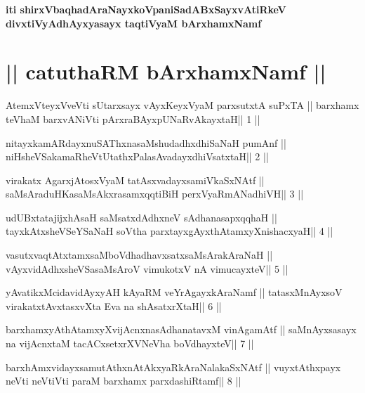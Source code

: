 \begin{center}
{\bf iti shirxVbaqhadAraNayxkoVpaniSadABxSayxvAtiRkeV\\ 
divxtiVyAdhAyxyasayx taqtiVyaM bArxhamxNamf}
\end{center}

\section{|| catuthaRM bArxhamxNamf  ||}

\begin{shl}
AtemxVteyxVveVti sUtarxsayx vAyxKeyxVyaM parxsutxtA suPxTA ||
barxhamx teV\s haM barxvANiVti pArxraBAyx\s\s pUNaRvAkayxtaH\hfill || 1 ||
\end{shl}

\begin{shl}
nitayxkamARdayxnuSAThxnasaMshudadhxdhiSaNaH pumAnf ||
niHsheVSakamaRheVtUtathxPalasAvadayxdhiVsatxtaH\hfill || 2 ||
\end{shl}

\begin{shl}
virakatx AgarxjAtosxV\s yaM tatAsxvadayxsamiVkaSxNAtf ||
saMsAraduHKasaMsAkxrasamxqqtiBiH perxVyaRmANadhiVH\hfill || 3 ||
\end{shl}

\begin{shl}
udUBxtatajijxhAsaH saMsatxdAdhxneV sAdhanasapxqqhaH ||
tayxkAtxsheVSeYSaNaH soV\s tha parxtayxgAyxthAtamxyXnishacxyaH\hfill || 4 ||
\end{shl}

\begin{shl}
vasutxvaqtAtxtamxsaMboVdhadhavxsatxsaMsArakAraNaH ||
vAyxvidAdhxsheVSasaMsAroV vimukotxV nA vimucayxteV\hfill || 5 ||
\end{shl}

\begin{shl}
yAvatikxMcidavidAyxyAH kAyaRM veYrAgayxkAraNamf ||
tatasxMnAyxsoV virakatxtAvxtasxvXta Eva na shAsatxrXtaH\hfill || 6 ||
\end{shl}

\begin{shl}
barxhamxyAthAtamxyXvijAcnxnasAdhanatavxM vinA\s\s gamAtf ||
saMnAyxsasayx na vijAcnxtaM tacACxsetxrXVNeVha boVdhayxteV\hfill || 7 ||
\end{shl}

\begin{shl}
barxhAmxvidayxsamutAthxnAtAkxyaRkAraNalakaSxNAtf ||
vuyxtAthxpayx neVti neVtiVti paraM barxhamx parxdashiRtamf\hfill || 8 ||
\end{shl}

